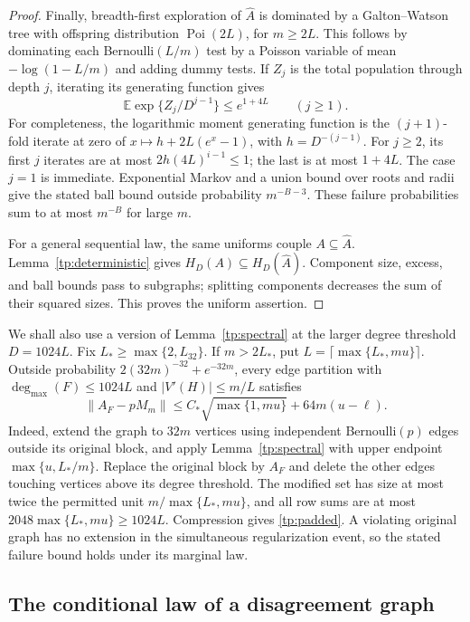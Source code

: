 \documentclass[11pt]{article}
\def\E{\mathbb{E}}
\numberwithin{equation}{section}
\begin{document}
\begin{proof}
Finally, breadth-first exploration of $\widehat A$ is dominated by a Galton--Watson tree with offspring distribution $\operatorname{Poi}(2L)$, for $m\ge2L$. This follows by dominating each Bernoulli$(L/m)$ test by a Poisson variable of mean $-\log(1-L/m)$ and adding dummy tests. If $Z_j$ is the total population through depth $j$, iterating its generating function gives
\[
 \E\exp\{Z_j/D^{j-1}\}\le e^{1+4L}\qquad(j\ge1).
\]
For completeness, the logarithmic moment generating function is the $(j+1)$-fold iterate at zero of $x\mapsto h+2L(e^x-1)$, with $h=D^{-(j-1)}$. For $j\ge2$, its first $j$ iterates are at most $2h(4L)^{i-1}\le1$; the last is at most $1+4L$. The case $j=1$ is immediate. Exponential Markov and a union bound over roots and radii give the stated ball bound outside probability $m^{-B-3}$. These failure probabilities sum to at most $m^{-B}$ for large $m$.

For a general sequential law, the same uniforms couple $A\subseteq\widehat A$. Lemma~\ref{tp:deterministic} gives $H_D(A)\subseteq H_D(\widehat A)$. Component size, excess, and ball bounds pass to subgraphs; splitting components decreases the sum of their squared sizes. This proves the uniform assertion.
\end{proof}

We shall also use a version of Lemma~\ref{tp:spectral} at the larger degree threshold $D=1024L$. Fix $L_*\ge\max\{2,L_{32}\}$. If $m>2L_*$, put $L=\lceil\max\{L_*,mu\}\rceil$. Outside probability $2(32m)^{-32}+e^{-32m}$, every edge partition with $\deg_{\max}(F)\le1024L$ and $|V'(H)|\le m/L$ satisfies
\begin{equation}\label{tp:padded}
 \|A_F-pM_m\|\le C_*\sqrt{\max\{1,mu\}}+64m(u-\ell).
\end{equation}
Indeed, extend the graph to $32m$ vertices using independent Bernoulli$(p)$ edges outside its original block, and apply Lemma~\ref{tp:spectral} with upper endpoint $\max\{u,L_*/m\}$. Replace the original block by $A_F$ and delete the other edges touching vertices above its degree threshold. The modified set has size at most twice the permitted unit $m/\max\{L_*,mu\}$, and all row sums are at most $2048\max\{L_*,mu\}\ge1024L$. Compression gives \eqref{tp:padded}. A violating original graph has no extension in the simultaneous regularization event, so the stated failure bound holds under its marginal law.

\subsection{The conditional law of a disagreement graph}
\end{document}
